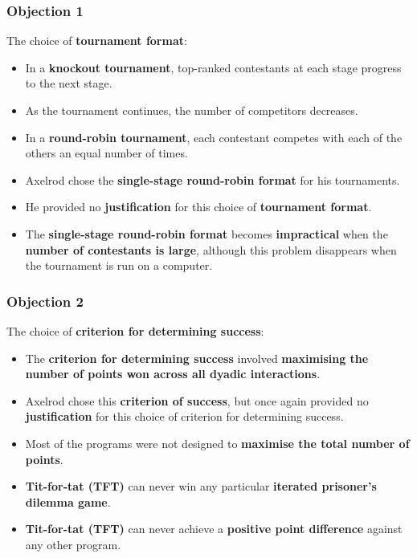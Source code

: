 \documentclass[11pt]{article}
\begin{document}
\subsubsection{Objection 1}
\label{sec:org8257e8a}
The choice of \textbf{tournament format}:
\begin{itemize}
\item In a \textbf{knockout tournament}, top-ranked contestants at each stage progress to the next stage.
\item As the tournament continues, the number of competitors decreases.
\item In a \textbf{round-robin tournament}, each contestant competes with each of the others an equal number of times.
\item Axelrod chose the \textbf{single-stage round-robin format} for his tournaments.
\item He provided no \textbf{justification} for this choice of \textbf{tournament format}.
\item The \textbf{single-stage round-robin format} becomes \textbf{impractical} when the \textbf{number of contestants is large}, although this problem disappears when the tournament is run on a computer.
\end{itemize}
\subsubsection{Objection 2}
\label{sec:org7d35fc1}
The choice of \textbf{criterion for determining success}:
\begin{itemize}
\item The \textbf{criterion for determining success} involved \textbf{maximising the number of points won across all dyadic interactions}.
\item Axelrod chose this \textbf{criterion of success}, but once again provided no \textbf{justification} for this choice of criterion for determining success.
\item Most of the programs were not designed to \textbf{maximise the total number of points}.
\item \textbf{Tit-for-tat (TFT)} can never win any particular \textbf{iterated prisoner's dilemma game}.
\item \textbf{Tit-for-tat (TFT)} can never achieve a \textbf{positive point difference} against any other program.
\end{itemize}
\end{document}
